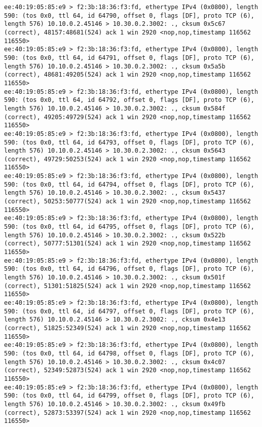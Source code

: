 \documentclass[a4paper,12pt]{article}
\begin{document}
\begin{Verbatim}
ee:40:19:05:85:e9 > f2:3b:18:36:f3:fd, ethertype IPv4 (0x0800), length 590: (tos 0x0, ttl 64, id 64790, offset 0, flags [DF], proto TCP (6), length 576) 10.10.0.2.45146 > 10.30.0.2.3002: ., cksum 0x5c67 (correct), 48157:48681(524) ack 1 win 2920 <nop,nop,timestamp 116562 116550>
ee:40:19:05:85:e9 > f2:3b:18:36:f3:fd, ethertype IPv4 (0x0800), length 590: (tos 0x0, ttl 64, id 64791, offset 0, flags [DF], proto TCP (6), length 576) 10.10.0.2.45146 > 10.30.0.2.3002: ., cksum 0x5a5b (correct), 48681:49205(524) ack 1 win 2920 <nop,nop,timestamp 116562 116550>
ee:40:19:05:85:e9 > f2:3b:18:36:f3:fd, ethertype IPv4 (0x0800), length 590: (tos 0x0, ttl 64, id 64792, offset 0, flags [DF], proto TCP (6), length 576) 10.10.0.2.45146 > 10.30.0.2.3002: ., cksum 0x584f (correct), 49205:49729(524) ack 1 win 2920 <nop,nop,timestamp 116562 116550>
ee:40:19:05:85:e9 > f2:3b:18:36:f3:fd, ethertype IPv4 (0x0800), length 590: (tos 0x0, ttl 64, id 64793, offset 0, flags [DF], proto TCP (6), length 576) 10.10.0.2.45146 > 10.30.0.2.3002: ., cksum 0x5643 (correct), 49729:50253(524) ack 1 win 2920 <nop,nop,timestamp 116562 116550>
ee:40:19:05:85:e9 > f2:3b:18:36:f3:fd, ethertype IPv4 (0x0800), length 590: (tos 0x0, ttl 64, id 64794, offset 0, flags [DF], proto TCP (6), length 576) 10.10.0.2.45146 > 10.30.0.2.3002: ., cksum 0x5437 (correct), 50253:50777(524) ack 1 win 2920 <nop,nop,timestamp 116562 116550>
ee:40:19:05:85:e9 > f2:3b:18:36:f3:fd, ethertype IPv4 (0x0800), length 590: (tos 0x0, ttl 64, id 64795, offset 0, flags [DF], proto TCP (6), length 576) 10.10.0.2.45146 > 10.30.0.2.3002: ., cksum 0x522b (correct), 50777:51301(524) ack 1 win 2920 <nop,nop,timestamp 116562 116550>
ee:40:19:05:85:e9 > f2:3b:18:36:f3:fd, ethertype IPv4 (0x0800), length 590: (tos 0x0, ttl 64, id 64796, offset 0, flags [DF], proto TCP (6), length 576) 10.10.0.2.45146 > 10.30.0.2.3002: ., cksum 0x501f (correct), 51301:51825(524) ack 1 win 2920 <nop,nop,timestamp 116562 116550>
ee:40:19:05:85:e9 > f2:3b:18:36:f3:fd, ethertype IPv4 (0x0800), length 590: (tos 0x0, ttl 64, id 64797, offset 0, flags [DF], proto TCP (6), length 576) 10.10.0.2.45146 > 10.30.0.2.3002: ., cksum 0x4e13 (correct), 51825:52349(524) ack 1 win 2920 <nop,nop,timestamp 116562 116550>
ee:40:19:05:85:e9 > f2:3b:18:36:f3:fd, ethertype IPv4 (0x0800), length 590: (tos 0x0, ttl 64, id 64798, offset 0, flags [DF], proto TCP (6), length 576) 10.10.0.2.45146 > 10.30.0.2.3002: ., cksum 0x4c07 (correct), 52349:52873(524) ack 1 win 2920 <nop,nop,timestamp 116562 116550>
ee:40:19:05:85:e9 > f2:3b:18:36:f3:fd, ethertype IPv4 (0x0800), length 590: (tos 0x0, ttl 64, id 64799, offset 0, flags [DF], proto TCP (6), length 576) 10.10.0.2.45146 > 10.30.0.2.3002: ., cksum 0x49fb (correct), 52873:53397(524) ack 1 win 2920 <nop,nop,timestamp 116562 116550>

\end{Verbatim}
\end{document}
